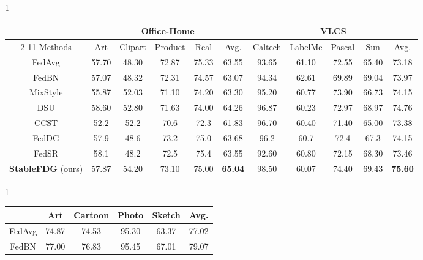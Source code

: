 \documentclass{article}
\theoremstyle{plain}
\theoremstyle{definition}
\theoremstyle{remark}
\begin{document}
 
\begin{table*}[!t]
 \centering
\begin{subtable}[!t]{1\linewidth}
	\scriptsize
	\centering
	\begin{tabular}{c||cccc|c||cccc|c}
		\toprule  
		&   \multicolumn{5}{c}{\textbf{Office-Home}} & \multicolumn{5}{c}{\textbf{VLCS}} \\
		\cmidrule{2-11}
	 Methods    & Art & Clipart	& Product & Real & Avg. & Caltech & LabelMe & Pascal & Sun & Avg.  \\
		\midrule
		FedAvg  \cite{mcmahan2017communication}&  57.70&	48.30	&72.87	&75.33	&63.55 &  93.65&	61.10	&72.55&	65.40&	73.18 \\		
		FedBN \cite{lifedbn}&  57.07	&48.32	&72.31&	74.57	&63.07 &  94.34	&62.61&	69.89&	69.04	&73.97 \\	
		MixStyle  \cite{zhou2021domain}&   55.87&	52.03	&71.10&	74.20&	63.30 &   95.20	&60.77	&73.90&	66.73&	74.15 \\
DSU  \cite{li2022uncertainty} &    58.60	&52.80&	71.63	&74.00&	64.26 & 96.87	&60.23	&72.97	&68.97&	74.76  \\
 CCST \cite{chen2023federated}  & 52.2	&52.2&	70.6&	72.3&	61.83 & 96.70	&60.40	&71.40&	65.00	&73.38 \\ 
 FedDG  \cite{liu2021feddg}     & 57.9&	48.6	&73.2&	75.0	&63.68  &96.2&	60.7	&72.4&	67.3&	74.15  \\
	      FedSR  \cite{nguyen2022fedsr}   & 58.1&	48.2&	72.5&	75.4&	63.55   & 92.60&	60.80&	72.15&	68.30&	73.46\\
	      \textbf{StableFDG}   (ours)   & 57.87&	54.20&	73.10&	75.00&	\textbf{\underline{65.04}}     & 98.50&	60.07&	74.40	&69.43	&\textbf{\underline{75.60}}\\
		\bottomrule
	\end{tabular}
		\caption{Office-Home  and VLCS datasets.}
\end{subtable}
\hfill
\newline
\begin{subtable}[t]{1\linewidth} 
	\scriptsize
\centering
	\begin{tabular}{c||    cccc | c}
		\toprule      &Art  & Cartoon & Photo & Sketch & Avg. \\ 
		\midrule
		FedAvg  \cite{mcmahan2017communication}&   74.87	&74.53&	95.30&	63.37&	77.02\\
		FedBN \cite{lifedbn} & 77.00	&76.83	&95.45	&67.01&	79.07 \\


\end{tabular}
\end{subtable}
\end{table*}
\end{document}
